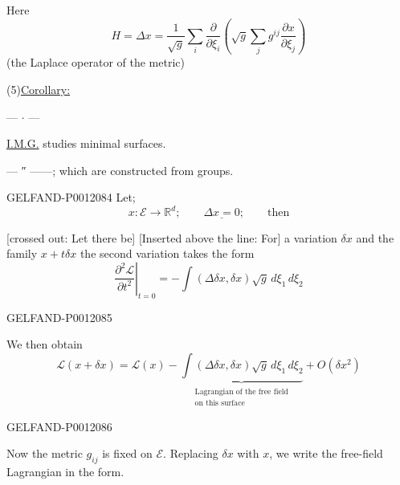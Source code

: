 Here
\[
H=\Delta x=\frac{1}{\sqrt g}\sum_i\frac{\partial}{\partial\xi_i}
\left(\sqrt g\sum_j g^{ij}\frac{\partial x}{\partial\xi_j}\right)
\]
(the Laplace operator of the metric)

(5)\quad\underline{Corollary:}


\begin{center}--- \(\cdot\) ---\end{center}

\underline{I.M.G.}\quad {} studies minimal surfaces.

\quad --- ″ ------; which are constructed from groups.

\begin{GelfandAdjacentEvidence}{GELFAND-P001208}{4}
Let;
\begin{equation*}
x:\mathcal E\longrightarrow\mathbb R^d;
\qquad\underline{\Delta x=0};\qquad\text{then}
\tag{6}
\end{equation*}

[crossed out: Let there be] [Inserted above the line: For]
a variation \(\delta x\) and the family \(x+t\delta x\) the second variation takes the form
\begin{equation*}
\left.\frac{\partial^2\mathcal L}{\partial t^2}\right|_{t=0}
=-\int(\Delta\delta x,\delta x)\sqrt g\,d\xi_1\,d\xi_2
\tag{7}
\end{equation*}
\end{GelfandAdjacentEvidence}
\begin{GelfandAdjacentEvidence}{GELFAND-P001208}{5}


We then obtain
\begin{equation*}
\mathcal L(x+\delta x)=\mathcal L(x)-
\underbrace{\int(\Delta\delta x,\delta x)\sqrt g\,d\xi_1\,d\xi_2}_{
\substack{\text{Lagrangian of the free field}\\\text{on this surface}}}
+O(\delta x^2)
\tag{8}
\end{equation*}
\end{GelfandAdjacentEvidence}
\begin{GelfandAdjacentEvidence}{GELFAND-P001208}{6}


Now the metric \(g_{ij}\) is fixed on \(\mathcal E\).
Replacing \(\delta x\) with \(x\), we write the free-field Lagrangian in the form.
\end{GelfandAdjacentEvidence}
